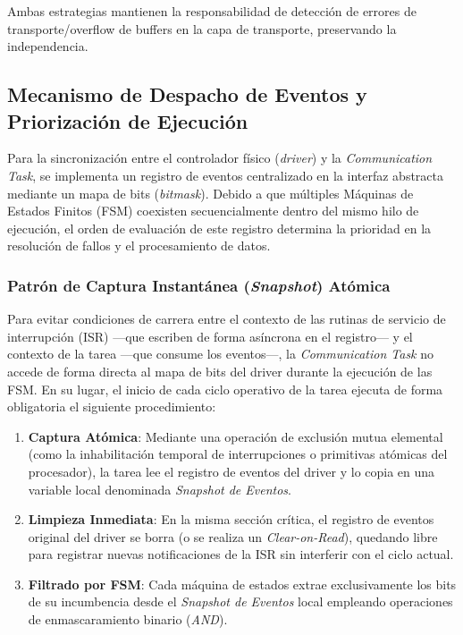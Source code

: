 Ambas estrategias mantienen la responsabilidad de detección de errores de transporte/overflow de buffers en la capa de transporte, preservando la independencia.

\subsection{Mecanismo de Despacho de Eventos y Priorización de Ejecución}
\label{subsec:despacho-eventos-prioridad}

Para la sincronización entre el controlador físico (\textit{driver}) y la \textit{Communication Task}, se implementa un registro de eventos centralizado en la interfaz abstracta mediante un mapa de bits (\textit{bitmask}). Debido a que múltiples Máquinas de Estados Finitos (FSM) coexisten secuencialmente dentro del mismo hilo de ejecución, el orden de evaluación de este registro determina la prioridad en la resolución de fallos y el procesamiento de datos.

\subsubsection{Patrón de Captura Instantánea (\textit{Snapshot}) Atómica}

Para evitar condiciones de carrera entre el contexto de las rutinas de servicio de interrupción (ISR) ---que escriben de forma asíncrona en el registro--- y el contexto de la tarea ---que consume los eventos---, la \textit{Communication Task} no accede de forma directa al mapa de bits del driver durante la ejecución de las FSM. En su lugar, el inicio de cada ciclo operativo de la tarea ejecuta de forma obligatoria el siguiente procedimiento:

\begin{enumerate}
    \item \textbf{Captura Atómica}: Mediante una operación de exclusión mutua elemental (como la inhabilitación temporal de interrupciones o primitivas atómicas del procesador), la tarea lee el registro de eventos del driver y lo copia en una variable local denominada \textit{Snapshot de Eventos}.
    \item \textbf{Limpieza Inmediata}: En la misma sección crítica, el registro de eventos original del driver se borra (o se realiza un \textit{Clear-on-Read}), quedando libre para registrar nuevas notificaciones de la ISR sin interferir con el ciclo actual.
    \item \textbf{Filtrado por FSM}: Cada máquina de estados extrae exclusivamente los bits de su incumbencia desde el \textit{Snapshot de Eventos} local empleando operaciones de enmascaramiento binario (\textit{AND}).
\end{enumerate}

